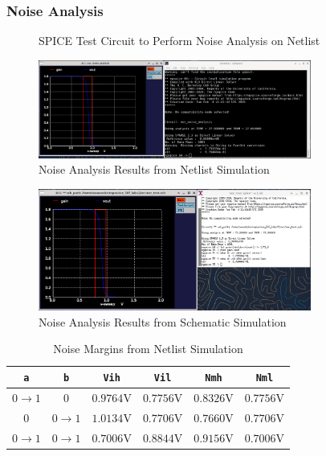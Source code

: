 \documentclass{article}
\begin{document}
	\subsubsection{Noise Analysis}
	
	\begin{figure}[H]
		
		\caption{SPICE Test Circuit to Perform Noise Analysis on Netlist}
		\label{fig::nor_noise_analysis_test_circuit}
	\end{figure}
	
	\begin{figure}[H]
		\centerline{\includegraphics[width=0.8\textwidth]{nor_noise_analysis.png}}
		\caption{Noise Analysis Results from Netlist Simulation}
		\label{fig::nor_noise_analysis}
	\end{figure}
	
	\begin{figure}[H]
		\centerline{\includegraphics[width=0.8\textwidth]{nor_noise_analysis_schem.png}}
		\caption{Noise Analysis Results from Schematic Simulation}
		\label{fig::nor_noise_analysis_schem}
	\end{figure}
	
	\begin{table}[H]
	\begin{center}
	\caption{Noise Margins from Netlist Simulation}
	\label{table::nor_gate_noise_analysis}
	\begin{tabular}{| c | c | c | c | c | c |}
		\hline
		\texttt{a} & \texttt{b} & \texttt{Vih} & \texttt{Vil} & \texttt{Nmh} & \texttt{Nml} \\
		\hline	
		$0 \rightarrow 1$ & $0$ & $0.9764 \text{V}$ & $0.7756 \text{V}$ & $0.8326 \text{V}$ & $0.7756 \text{V}$\\
		\hline	
		$0$ & $0 \rightarrow 1$ & $1.0134 \text{V}$ & $0.7706 \text{V}$ & $0.7660 \text{V}$ & $0.7706 \text{V}$\\
		\hline	
		$0 \rightarrow 1$ & $0 \rightarrow 1$ & $0.7006 \text{V}$ & $0.8844 \text{V}$ & $0.9156 \text{V}$ & $0.7006 \text{V}$\\
		\hline
	\end{tabular}
	\end{center}
	\end{table}
	
\end{document}
